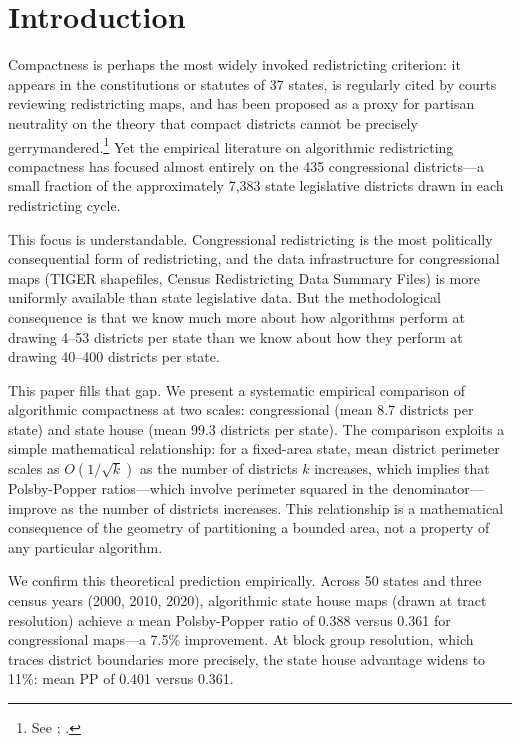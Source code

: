 \section{Introduction}
\label{sec:introduction}

Compactness is perhaps the most widely invoked redistricting criterion: it appears in the constitutions or statutes of 37 states, is regularly cited by courts reviewing redistricting maps, and has been proposed as a proxy for partisan neutrality on the theory that compact districts cannot be precisely gerrymandered.\footnote{See \citet{polsby1991third}; \citet{grofman1985criteria}.} Yet the empirical literature on algorithmic redistricting compactness has focused almost entirely on the 435 congressional districts---a small fraction of the approximately 7,383 state legislative districts drawn in each redistricting cycle.

This focus is understandable. Congressional redistricting is the most politically consequential form of redistricting, and the data infrastructure for congressional maps (TIGER shapefiles, Census Redistricting Data Summary Files) is more uniformly available than state legislative data. But the methodological consequence is that we know much more about how algorithms perform at drawing 4--53 districts per state than we know about how they perform at drawing 40--400 districts per state.

This paper fills that gap. We present a systematic empirical comparison of algorithmic compactness at two scales: congressional (mean 8.7 districts per state) and state house (mean 99.3 districts per state). The comparison exploits a simple mathematical relationship: for a fixed-area state, mean district perimeter scales as $O(1/\sqrt{k})$ as the number of districts $k$ increases, which implies that Polsby-Popper ratios---which involve perimeter squared in the denominator---improve as the number of districts increases. This relationship is a mathematical consequence of the geometry of partitioning a bounded area, not a property of any particular algorithm.

We confirm this theoretical prediction empirically. Across 50 states and three census years (2000, 2010, 2020), algorithmic state house maps (drawn at tract resolution) achieve a mean Polsby-Popper ratio of 0.388 versus 0.361 for congressional maps---a 7.5\% improvement. At block group resolution, which traces district boundaries more precisely, the state house advantage widens to 11\%: mean PP of 0.401 versus 0.361.

